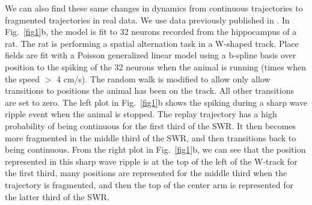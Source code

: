 \documentclass[conference]{IEEEtran}
\begin{document}
We can also find these same changes in dynamics from continuous trajectories to fragmented trajectories in real data. We use data previously published in \cite{KarlssonAwakereplayremote2009}. In Fig.~\ref{fig1}b, the model is fit to 32 neurons recorded from the hippocampus of a rat. The rat is performing a spatial alternation task in a W-shaped track. Place fields are fit with a Poisson generalized linear model using a b-spline basis over position to the spiking of the 32 neurons when the animal is running (times when the speed $>$ 4 cm/s). The random walk is modified to allow only allow transitions  to positions the animal has been on the track. All other transitions are set to zero. The left plot in Fig.~\ref{fig1}b shows the spiking during a sharp wave ripple event when the animal is stopped. The replay trajectory has a high probability of being continuous for the first third of the SWR. It then becomes more fragmented in the middle third of the SWR, and then transitions back to being continuous. From the right plot in Fig.~\ref{fig1}b, we can see that the position represented in this sharp wave ripple is at the top of the left of the W-track for the first third, many positions are represented for the middle third when the trajectory is fragmented, and then the top of the center arm is represented for the latter third of the SWR.
\end{document}

